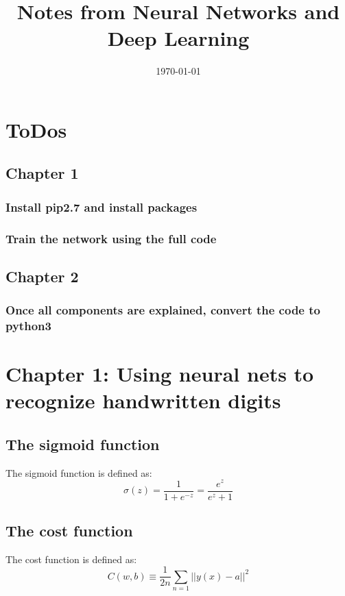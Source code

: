 \documentclass[11pt]{article}
\date{\today}
\title{Notes from Neural Networks and Deep Learning}
\begin{document}
\maketitle

\section{ToDos}
\label{sec:org7579ffc}
\subsection{Chapter 1}
\label{sec:org50b7fa1}
\subsubsection{Install pip2.7 and install packages}
\label{sec:org53c39ed}
\subsubsection{Train the network using the full code}
\label{sec:org7bb40b3}

\subsection{Chapter 2}
\label{sec:org2ccd6ee}
\subsubsection{Once all components are explained, convert the code to python3}
\label{sec:orgf20fbe8}


\clearpage


\section{Chapter 1: Using neural nets to recognize handwritten digits}
\label{sec:orgbe2bf40}
\subsection{The sigmoid function}
\label{sec:org6754a13}
The sigmoid function is defined as:
\begin{equation} \label{eqn:sigmoid}
\sigma(z) = \frac{1}{1 + e^{-z}} = \frac{e^z}{e^z + 1}
\end{equation}

\subsection{The cost function}
\label{sec:org6a978cb}
The cost function is defined as:
\begin{equation} \label{eqn:cost}
C(w,b) \equiv \frac{1}{2n} \sum_{n=1} ||y(x) - a||^2
\end{equation}
\end{document}
